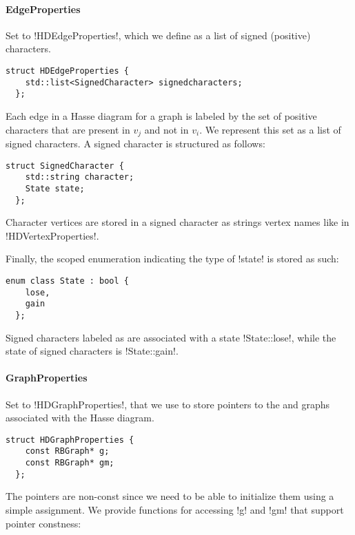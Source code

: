 \paragraph{EdgeProperties}

Set to !HDEdgeProperties!, which we define as a list of signed (positive) characters.

\begin{lstlisting}[moreemph={SignedCharacter}]
  struct HDEdgeProperties {
    std::list<SignedCharacter> signedcharacters;
  };
\end{lstlisting}

Each edge  in a Hasse diagram for a graph \gm{} is labeled by the set of positive characters that are present in $v_{j}$ and not in $v_{i}$.
We represent this set as a list of signed characters. A signed character is structured as follows:

\begin{lstlisting}[belowskip=0pt, moreemph={State}]
  struct SignedCharacter {
    std::string character;
    State state;
  };
\end{lstlisting}

Character vertices are stored in a signed character as strings \textendash{} vertex names \textendash{} like in !HDVertexProperties!.

Finally, the scoped enumeration indicating the type of !state! is stored as such:

\begin{lstlisting}[belowskip=0pt]
  enum class State : bool {
    lose,
    gain
  };
\end{lstlisting}

Signed characters labeled as \character[][-] are associated with a state !State::lose!, while the state of signed characters \character[][+] is !State::gain!.

\paragraph{GraphProperties}

Set to !HDGraphProperties!, that we use to store pointers to the \grb{} and \gm{} graphs associated with the Hasse diagram.

\begin{lstlisting}[moreemph={RBGraph}]
  struct HDGraphProperties {
    const RBGraph* g;
    const RBGraph* gm;
  };
\end{lstlisting}

The pointers are non-const since we need to be able to initialize them using a simple assignment.
We provide functions for accessing !g! and !gm! that support pointer constness:

